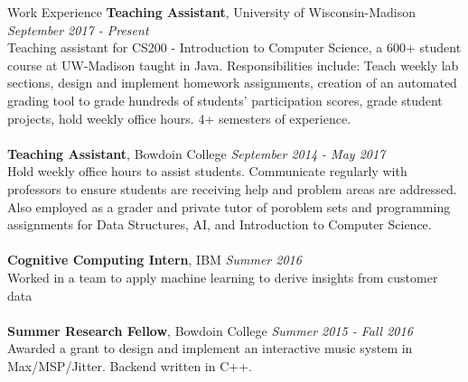 \documentclass{resume} %
\begin{document}
\begin{rSection}{Work Experience}
{\bf Teaching Assistant}, University of Wisconsin-Madison \hfill {\em September 2017 - Present} 
\\Teaching assistant for CS200 - Introduction to Computer Science, a 600+ student course at UW-Madison taught in Java. Responsibilities include: Teach weekly lab sections, design and implement homework assignments, creation of an automated grading tool to grade hundreds of students' participation scores, grade student projects, hold weekly office hours. 4+ semesters of experience. \\

\\{\bf Teaching Assistant}, Bowdoin College \hfill {\em September 2014 - May 2017}\\
Hold weekly office hours to assist students. Communicate regularly with professors to ensure students are receiving help and problem areas are addressed. Also employed as a grader and private tutor of poroblem sets and programming assignments for Data Structures, AI, and Introduction to Computer Science. \\

\\{\bf Cognitive Computing Intern}, IBM \hfill {\em Summer 2016} \\
Worked in a team to apply machine learning to derive insights from customer data\\

\\{\bf Summer Research Fellow}, Bowdoin College \hfill {\em Summer 2015 - Fall 2016}\\
Awarded a grant to design and implement an interactive music system in Max/MSP/Jitter. Backend written in C++.

\end{rSection}
\end{document}
